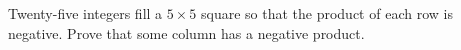 Twenty-five integers fill a $5\times5$ square so that the product of each row is negative. Prove that some column has a negative product.
